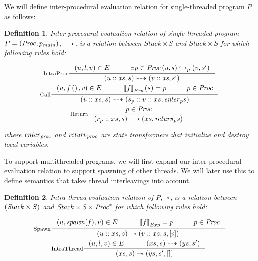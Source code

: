 \documentclass[..thesis.tex]{subfiles}
\newtheorem{defin}{Definition}[section]
\begin{document}
We will define inter-procedural evaluation relation for single-threaded program $P$ as follows:

\begin{defin}

Inter-procedural evaluation relation of single-threaded program $P = \left( \mathit{Proc},p_{\mathit{main}} \right) $, 
$\dashrightarrow$, is a relation between $Stack \times S$ and $Stack \times S$ for which following rules hold:

\addtolength{\jot}{2em}
\begin{gather*}
  \inference[IntraProc]{\lp u, l, v \rp \in E  \separ \exists p \in \mathword{Proc}  \lp u, s \rp \intraproc_p \lp v, s' \rp }{ \lp u :: \mathword{xs}, s \rp \interproc \lp v :: \mathword{xs}, s` \rp} \\
  \inference[Call]{ \lp u, f\lp\rp , v \rp  \in E \separ  \lllb f \rrrb_{\mathword{Exp}} \lp s \rp = p \separ p \in \mathword{Proc} }{\lp u :: xs , s \rp \interproc \lp s_{p} :: v :: xs, \mathword{enter}_{p} s \rp} \\
  \inference[Return] { p \in \mathword{Proc}} { \lp r_{p}::xs , s \rp \interproc \lp xs, \mathword{return}_{p} s \rp}
\end{gather*}
\addtolength{\jot}{-2em}

where $\mathit{enter}_{\mathit{proc}}$ and $\mathit{return}_{\mathit{proc}}$ are state transformers that initialize and destroy local variables.
\end{defin}


To support multithreaded programs, we will first expand our inter-procedural evaluation relation to support spawning of other threads.
We will later use this to define semantics that takes thread interleavings into account.

\begin{defin}

  Intra-thread evaluation relation of $P$,$\twoheadrightarrow$,
  is a relation between $\left( \mathit{Stack} \times S \right)$ and $\mathit{Stack} \times S \times \mathit{Proc}^\ast$ for which following rules hold:

  \addtolength{\jot}{2em}
  \begin{gather*}
    \inference[Spawn]{\lp u, \mathword{spawn}(f), v \rp \in E  \separ  \lllb f \rrrb_{Exp} = p \separ p \in \mathword{Proc}}{ \lp u :: xs, s \rp \intrathread \lp v :: xs, s, \lbk p \rbk \rp} \\
    \inference[IntraThread] {\lp u, l , v \rp \in E \separ \lp xs , s \rp \interproc \lp ys, s' \rp }{ \lp xs , s \rp \intrathread \lp ys, s', \lbk \rbk \rp} \text{.}
  \end{gather*}
  \addtolength{\jot}{-2em}

\end{defin}
\end{document}
